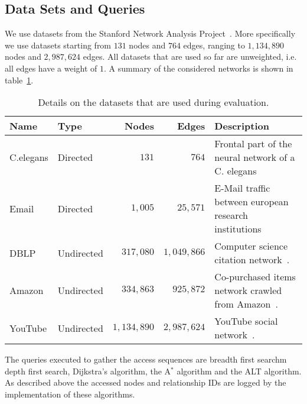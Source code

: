     \subsection*{Data Sets and Queries}
        We use datasets from the Stanford Network Analysis Project~\autocite{snap}.
        More specifically we use datasets starting from $131$ nodes and $764$ edges, ranging to $1,134,890$ nodes and $2,987,624$ edges.
        All datasets that are used so far are unweighted, i.e. all edges have a weight of $1$.
        A summary of the considered networks is shown in table~\ref{datasets}.
        \begin{table}
        \begin{center}
            \begin{tabular}[c]{l l r r p{5.8cm}} \toprule
                Name & Type & Nodes & Edges & Description \\ \midrule
                 C.elegans & Directed & $131$ & $764$ & Frontal part of the neural network of a C. elegans~\autocite{celegans} \\ [0.8cm]
                 Email & Directed & $1,005$ & $25,571$ & E-Mail traffic between european research institutions~\autocite{email} \\ [0.8cm]
                 DBLP & Undirected & $317,080$ & $1,049,866$ & Computer science citation network~\autocite{lj}. \\ [0.8cm]
                 Amazon & Undirected & $334,863$ & $925,872$ & Co-purchased items network crawled from Amazon~\autocite{lj}. \\ [0.8cm]
                 YouTube & Undirected & $1,134,890$ & $2,987,624$ & YouTube social network~\autocite{mislove}. \\ \bottomrule
            \end{tabular}
            \end{center}
            \caption{Details on the datasets that are used during evaluation.}
            \label{datasets}
        \end{table}
        The queries executed to gather the access sequences are breadth first searchm depth first search, Dijkstra's algorithm, the A$^*$ algorithm and the ALT algorithm.
        As described above the accessed nodes and relationship IDs are logged by the implementation of these algorithms.

